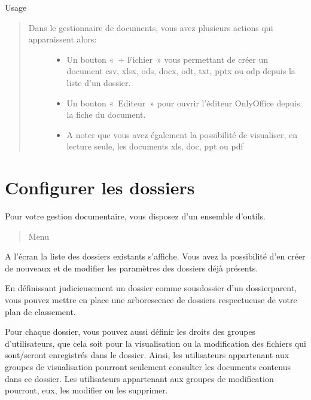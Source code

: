 \documentclass[a4paper,10pt,oneside,french]{sphinxmanual}
\begin{document}
\sphinxAtStartPar
Usage
\begin{quote}
\begin{description}
\item[{Dans le gestionnaire de documents, vous avez plusieurs actions qui apparaissent alors:}] \leavevmode\begin{itemize}
\item {} 
\sphinxAtStartPar
Un bouton « + Fichier » vous permettant de créer un document csv, xlsx, ods, docx, odt, txt, pptx ou odp depuis la liste d’un dossier.

\item {} 
\sphinxAtStartPar
Un bouton « Editeur » pour ouvrir l’éditeur OnlyOffice depuis la fiche du document.

\item {} 
\sphinxAtStartPar
A noter que vous avez également la possibilité de visualiser, en lecture seule, les documents xls, doc, ppt ou pdf

\end{itemize}

\end{description}
\end{quote}

\noindent{}


\section{Configurer les dossiers}
\label{\detokenize{documents/configuration:configurer-les-dossiers}}\label{\detokenize{documents/configuration::doc}}
\sphinxAtStartPar
Pour votre gestion documentaire, vous disposez d’un ensemble d’outils.
\begin{quote}

\sphinxAtStartPar
Menu 
\end{quote}

\sphinxAtStartPar
A l’écran la liste des dossiers existants s’affiche. Vous avez la possibilité d’en créer de nouveaux et de modifier les paramètres des dossiers déjà présents.

\noindent{}

\sphinxAtStartPar
En définissant judicieusement un dossier comme sous\sphinxhyphen{}dossier d’un dossier\sphinxhyphen{}parent, vous pouvez  mettre en place une arborescence de dossiers respectueuse de votre plan de classement.

\sphinxAtStartPar
Pour chaque dossier, vous pouvez aussi définir les droits des groupes d’utilisateurs, que cela soit pour la visualisation ou la modification des fichiers qui sont/seront enregistrés dans le dossier.
Ainsi, les utilisateurs appartenant aux groupes de visualisation pourront seulement consulter les documents contenus dans ce dossier. Les utilisateurs appartenant aux groupes de modification pourront, eux, les modifier ou les supprimer.
\end{document}

